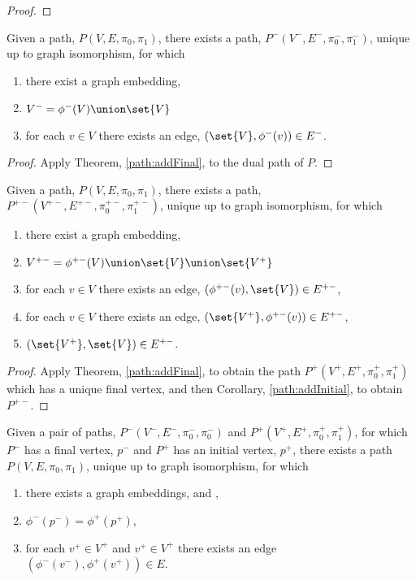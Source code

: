\documentclass[a4paper]{amsart}
\begin{document}
\begin{proof}
\end{proof}

\begin{corollary}\label{path:addInitial}
Given a path, $P(V, E, \pi_0, \pi_1)$, there exists a path, $P^-(V^-, E^-, \pi^-_0,
\pi^-_1)$,  unique up to graph isomorphism, for which
\begin{enumerate}
\item there exist a graph embedding, 
\item $V^- = \phi^-(V) \union \set{V}$
\item for each $v \in V$ there exists an edge, $(\set{V}, \phi^-(v)) \in E^-$.
\end{enumerate}
\end{corollary}

\begin{proof}
Apply Theorem, \ref{path:addFinal}, to the dual path of $P$.
\end{proof}

\begin{corollary}
Given a path, $P(V, E, \pi_0, \pi_1)$, there exists a path, $P^{+-}(V^{+-}, E^{+-},
\pi^{+-}_0, \pi^{+-}_1)$,  unique up to graph isomorphism, for which
\begin{enumerate}
\item there exist a graph embedding, 
\item $V^{+-} = \phi^{+-}(V) \union \set{V} \union \set{V^+}$
\item for each $v \in V$ there exists an edge, $(\phi^{+-}(v), \set{V}) \in E^{+-}$,
\item for each $v \in V$ there exists an edge, $(\set{V^+}, \phi^{+-}(v)) \in E^{+-}$,
\item $(\set{V^+}, \set{V}) \in E^{+-}$.
\end{enumerate}
\end{corollary}

\begin{proof}
Apply Theorem, \ref{path:addFinal}, to obtain the path $P^+(V^+, E^+, \pi^+_0, \pi^+_1)$
which has a unique final vertex, and then Corollary, \ref{path:addInitial}, to obtain
$P^{+-}$.
\end{proof}

\begin{theorem}
Given a pair of paths, $P^-(V^-, E^-, \pi^-_0, \pi^-_0)$ and $P^+(V^+, E^+, \pi^+_0,
\pi^+_1)$, for which $P^-$ has a final vertex, $p^-$ and $P^+$ has an initial vertex,
$p^+$, there exists a path $P(V, E, \pi_0, \pi_1)$, unique up to graph isomorphism, for
which
\begin{enumerate}
\item there exists a graph embeddings,  and ,
\item $\phi^-(p^-) = \phi^+(p^+)$,
\item for each $v^+ \in V^+$ and $v^+ \in V^+$ there exists an edge $(\phi^-(v^-), 
\phi^+(v^+)) \in E$.
\end{enumerate}
\end{theorem}
\end{document}
